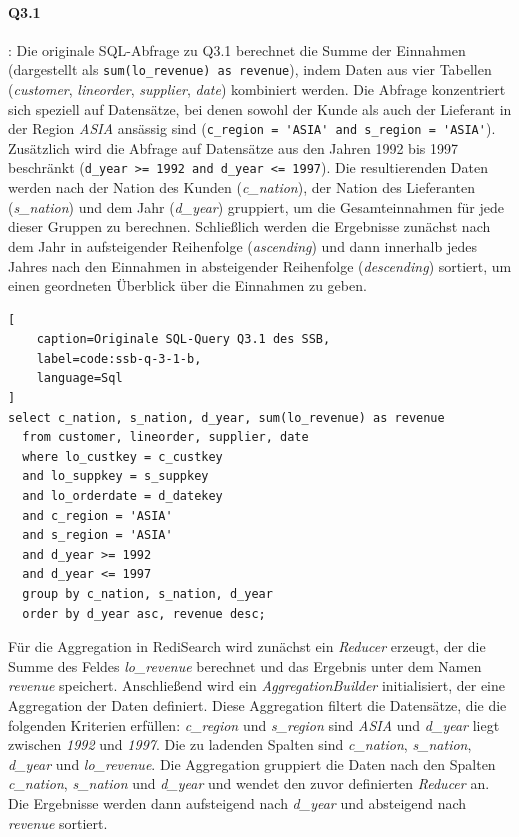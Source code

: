 \paragraph{Q3.1}: Die originale SQL-Abfrage zu Q3.1 berechnet die Summe der Einnahmen (dargestellt als \lstinline|sum(lo_revenue) as revenue|), indem Daten aus vier Tabellen (\emph{customer}, \emph{lineorder}, \emph{supplier}, \emph{date}) kombiniert werden. Die Abfrage konzentriert sich speziell auf Datensätze, bei denen sowohl der Kunde als auch der Lieferant in der Region \emph{ASIA} ansässig sind (\lstinline|c_region = 'ASIA' and s_region = 'ASIA'|). Zusätzlich wird die Abfrage auf Datensätze aus den Jahren 1992 bis 1997 beschränkt (\lstinline|d_year >= 1992 and d_year <= 1997|).
Die resultierenden Daten werden nach der Nation des Kunden (\emph{c\_nation}), der Nation des Lieferanten (\emph{s\_nation}) und dem Jahr (\emph{d\_year}) gruppiert, um die Gesamteinnahmen für jede dieser Gruppen zu berechnen.
Schließlich werden die Ergebnisse zunächst nach dem Jahr in aufsteigender Reihenfolge (\emph{ascending}) und dann innerhalb jedes Jahres nach den Einnahmen in absteigender Reihenfolge (\emph{descending}) sortiert, um einen geordneten Überblick über die Einnahmen zu geben.

\begin{lstlisting}[
    caption=Originale SQL-Query Q3.1 des SSB,
    label=code:ssb-q-3-1-b,
    language=Sql
]
select c_nation, s_nation, d_year, sum(lo_revenue) as revenue
  from customer, lineorder, supplier, date
  where lo_custkey = c_custkey
  and lo_suppkey = s_suppkey
  and lo_orderdate = d_datekey
  and c_region = 'ASIA'
  and s_region = 'ASIA'
  and d_year >= 1992
  and d_year <= 1997
  group by c_nation, s_nation, d_year
  order by d_year asc, revenue desc;
\end{lstlisting}

Für die Aggregation in RediSearch wird zunächst ein \emph{Reducer} erzeugt, der die Summe des Feldes \emph{lo\_revenue} berechnet und das Ergebnis unter dem Namen \emph{revenue} speichert. Anschließend wird ein \emph{AggregationBuilder} initialisiert, der eine Aggregation der Daten definiert. Diese Aggregation filtert die Datensätze, die die folgenden Kriterien erfüllen: \emph{c\_region} und \emph{s\_region} sind \emph{ASIA} und \emph{d\_year} liegt zwischen \emph{1992} und \emph{1997}. Die zu ladenden Spalten sind \emph{c\_nation}, \emph{s\_nation}, \emph{d\_year} und \emph{lo\_revenue}.
Die Aggregation gruppiert die Daten nach den Spalten \emph{c\_nation}, \emph{s\_nation} und \emph{d\_year} und wendet den zuvor definierten \emph{Reducer} an. Die Ergebnisse werden dann aufsteigend nach \emph{d\_year} und absteigend nach \emph{revenue} sortiert.

